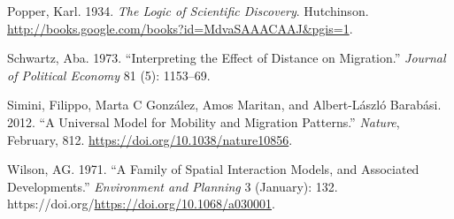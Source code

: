 \documentclass[11pt,letterpaper]{article}
\newlength{\cslhangindent}
\newlength{\cslentryspacingunit} %
\newenvironment{CSLReferences}[2] %
 {%
  \setlength{\parindent}{0pt}
  \ifodd #1
  \let\oldpar\par
  \def\par{\hangindent=\cslhangindent\oldpar}
  \fi
  \setlength{\parskip}{#2\cslentryspacingunit}
 }%
 {}
\begin{document}
\begin{CSLReferences}{1}{0}
\leavevmode{}%
Popper, Karl. 1934. \emph{The Logic of Scientific Discovery}. Hutchinson. \url{http://books.google.com/books?id=MdvaSAAACAAJ\&pgis=1}.

\leavevmode{}%
Schwartz, Aba. 1973. {``Interpreting the Effect of Distance on Migration.''} \emph{Journal of Political Economy} 81 (5): 1153--69.

\leavevmode{}%
Simini, Filippo, Marta C González, Amos Maritan, and Albert-László Barabási. 2012. {``A Universal Model for Mobility and Migration Patterns.''} \emph{Nature}, February, 812. \url{https://doi.org/10.1038/nature10856}.

\leavevmode{}%
Wilson, AG. 1971. {``A Family of Spatial Interaction Models, and Associated Developments.''} \emph{Environment and Planning} 3 (January): 132. https://doi.org/\url{https://doi.org/10.1068/a030001}.

\end{CSLReferences}




\setlength{\bibsep}{0.00cm plus 0.05cm} %


\end{document}
